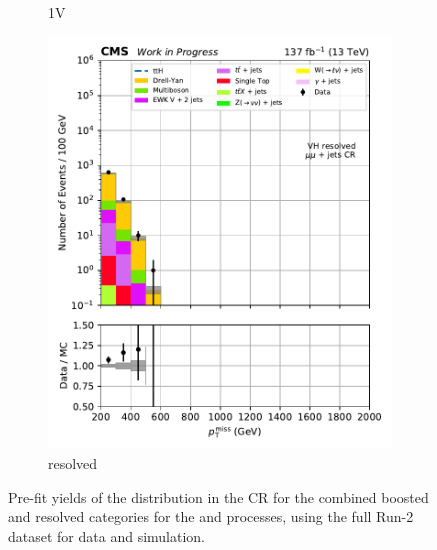 \begin{figure}[htbp]
\begin{subfigure}[b]{0.24\textwidth}
        \caption{\VH 1V}
    \end{subfigure}
    \hfill
    \begin{subfigure}[b]{0.24\textwidth}
        \includegraphics[width=\textwidth]{figures/region_plots/full_Run2/region_2/VH_resolved.pdf}
        \caption{\VH resolved}
    \end{subfigure}
    \caption[Pre-fit yields of the \ptmiss distribution in the \doubleMuCr control region for the combined boosted and resolved categories for the \ttH and \VH processes, using the full Run-2 dataset for data and simulation]{Pre-fit yields of the \ptmiss distribution in the \doubleMuCr \gls{CR} for the combined boosted and resolved categories for the \ttH and \VH processes, using the full Run-2 dataset for data and simulation.}
    \label{fig:htoinv_cr_yields_comb2016to18_double_muon}
\end{figure}

